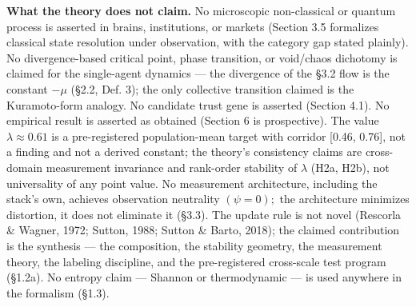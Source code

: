 \documentclass[11pt,twocolumn]{article}
\theoremstyle{gttdef}
\theoremstyle{gttplain}
\begin{document}
\textbf{What the theory does not claim.} No microscopic non-classical or quantum process is asserted in brains, institutions, or markets (Section 3.5 formalizes classical state resolution under observation, with the category gap stated plainly). No divergence-based critical point, phase transition, or void/chaos dichotomy is claimed for the single-agent dynamics --- the divergence of the \S{}3.2 flow is the constant $-\mu$ (\S{}2.2, Def. 3); the only collective transition claimed is the Kuramoto-form analogy. No candidate trust gene is asserted (Section 4.1). No empirical result is asserted as obtained (Section 6 is prospective). The value $\lambda \approx 0.61$ is a pre-registered population-mean target with corridor [0.46, 0.76], not a finding and not a derived constant; the theory's consistency claims are cross-domain measurement invariance and rank-order stability of $\lambda$ (H2a, H2b), not universality of any point value. No measurement architecture, including the stack's own, achieves observation neutrality $(\psi = 0);$ the architecture minimizes distortion, it does not eliminate it (\S{}3.3). The update rule is not novel (Rescorla \& Wagner, 1972; Sutton, 1988; Sutton \& Barto, 2018); the claimed contribution is the synthesis --- the composition, the stability geometry, the measurement theory, the labeling discipline, and the pre-registered cross-scale test program (\S{}1.2a). No entropy claim --- Shannon or thermodynamic --- is used anywhere in the formalism (\S{}1.3).
\end{document}
